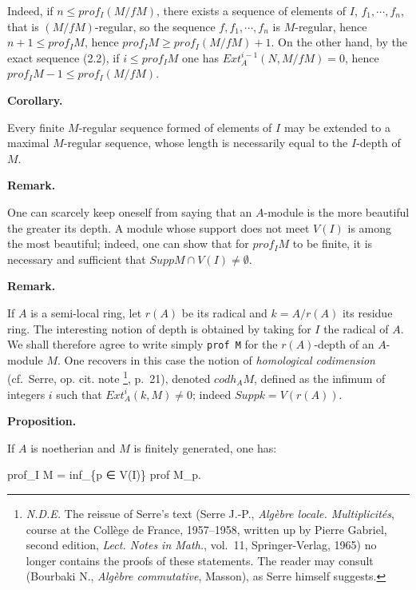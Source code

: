 \documentclass[
  11pt,
  a4paper,
]{book}
\newenvironment{Shaded}{}{}
\newcommand{\NormalTok}[1]{#1}
\begin{document}
Indeed, if \(n \leqslant prof_{I}(M/f M)\), there exists a sequence of
elements of \(I\), \(f_{1}, \cdots, f_{n}\), that is
\((M/f M)\)-regular, so the sequence \(f, f_{1}, \cdots, f_{n}\) is
\(M\)-regular, hence \(n + 1 \leqslant prof_{I} M\), hence
\(prof_{I} M \geqslant prof_{I}(M/f M) + 1\). On the other hand, by the
exact sequence (2.2), if \(i \leqslant prof_{I} M\) one has
\(Ext^{i-1}_{A}(N, M/f M) = 0\), hence
\(prof_{I} M - 1 \leqslant prof_{I}(M/f M)\).

\textbf{Corollary.}

Every finite \(M\)-regular sequence formed of elements of \(I\) may be
extended to a maximal \(M\)-regular sequence, whose length is
necessarily equal to the \(I\)-depth of \(M\).

\textbf{Remark.}

One can scarcely keep oneself from saying that an \(A\)-module is the
more beautiful the greater its depth. A module whose support does not
meet \(V(I)\) is among the most beautiful; indeed, one can show that for
\(prof_{I} M\) to be finite, it is necessary and sufficient that
\(Supp M \cap V(I) \neq \emptyset\).

\textbf{Remark.}

If \(A\) is a semi-local ring, let \(r(A)\) be its radical and
\(k = A/r(A)\) its residue ring. The interesting notion of depth is
obtained by taking for \(I\) the radical of \(A\). We shall therefore
agree to write simply \texttt{prof\ M} for the \(r(A)\)-depth of an
\(A\)-module \(M\). One recovers in this case the notion of
\emph{homological codimension} (cf.~Serre, op. cit. note \footnote{\emph{N.D.E.}
  The reissue of Serre's text (Serre J.-P., \emph{Algèbre locale.
  Multiplicités}, course at the Collège de France, 1957--1958, written
  up by Pierre Gabriel, second edition, \emph{Lect. Notes in Math.},
  vol.~11, Springer-Verlag, 1965) no longer contains the proofs of these
  statements. The reader may consult (Bourbaki N., \emph{Algèbre
  commutative}, Masson), as Serre himself suggests.}, p.~21), denoted
\(codh_{A} M\), defined as the infimum of integers \(i\) such that
\(Ext^{i}_{A}(k,
M) \neq 0\); indeed \(Supp k = V(r(A))\).

\textbf{Proposition.}

If \(A\) is noetherian and \(M\) is finitely generated, one has:

\begin{Shaded}
\begin{Highlighting}[]
\NormalTok{prof\_I M = inf\_\{p ∈ V(I)\} prof M\_p.}
\end{Highlighting}
\end{Shaded}
\end{document}
